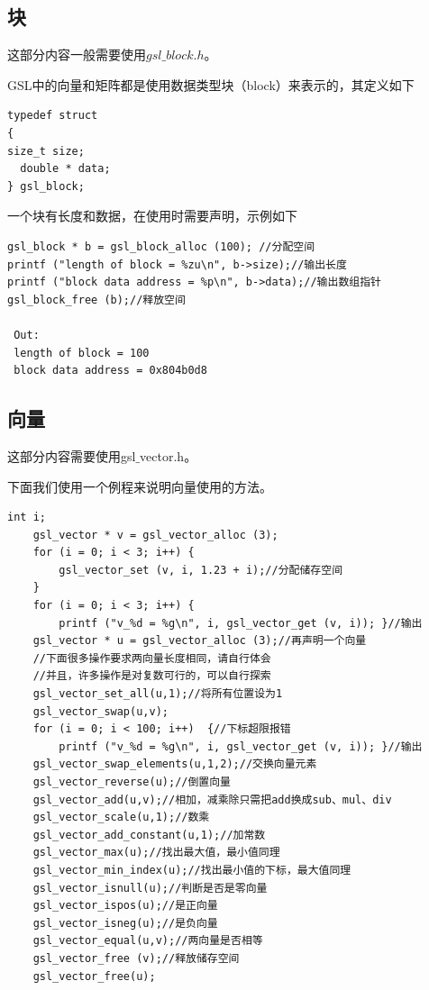 \documentclass[a4paper,11pt,onecolumn,twoside]{article}
\begin{document}
\subsection{块}
这部分内容一般需要使用$gsl\_block.h$。\par
GSL中的向量和矩阵都是使用数据类型块（block）来表示的，其定义如下
\begin{lstlisting}
typedef struct
{
size_t size;
  double * data;
} gsl_block;
\end{lstlisting}
一个块有长度和数据，在使用时需要声明，示例如下
\begin{lstlisting}
gsl_block * b = gsl_block_alloc (100); //分配空间
printf ("length of block = %zu\n", b->size);//输出长度
printf ("block data address = %p\n", b->data);//输出数组指针
gsl_block_free (b);//释放空间
  
 Out:
 length of block = 100
 block data address = 0x804b0d8

\end{lstlisting}

\subsection{向量}
这部分内容需要使用gsl$\_$vector.h。\par
下面我们使用一个例程来说明向量使用的方法。
\newpage

\begin{lstlisting}
int i;
    gsl_vector * v = gsl_vector_alloc (3);
    for (i = 0; i < 3; i++) {
        gsl_vector_set (v, i, 1.23 + i);//分配储存空间
    }
    for (i = 0; i < 3; i++) {
        printf ("v_%d = %g\n", i, gsl_vector_get (v, i)); }//输出
    gsl_vector * u = gsl_vector_alloc (3);//再声明一个向量
    //下面很多操作要求两向量长度相同，请自行体会
    //并且，许多操作是对复数可行的，可以自行探索
    gsl_vector_set_all(u,1);//将所有位置设为1
    gsl_vector_swap(u,v);
    for (i = 0; i < 100; i++)  {//下标超限报错
        printf ("v_%d = %g\n", i, gsl_vector_get (v, i)); }//输出
    gsl_vector_swap_elements(u,1,2);//交换向量元素
    gsl_vector_reverse(u);//倒置向量
    gsl_vector_add(u,v);//相加，减乘除只需把add换成sub、mul、div
    gsl_vector_scale(u,1);//数乘
    gsl_vector_add_constant(u,1);//加常数
    gsl_vector_max(u);//找出最大值，最小值同理
    gsl_vector_min_index(u);//找出最小值的下标，最大值同理
    gsl_vector_isnull(u);//判断是否是零向量
    gsl_vector_ispos(u);//是正向量
    gsl_vector_isneg(u);//是负向量
    gsl_vector_equal(u,v);//两向量是否相等
    gsl_vector_free (v);//释放储存空间
    gsl_vector_free(u);
\end{lstlisting}
\end{document}
